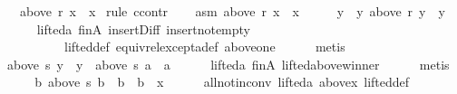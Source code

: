 \begin{isabellebody}
\ \ \ {\isachardoublequoteopen}above\ r\ x\ {\isacharequal}{\kern0pt}\ {\isacharbraceleft}{\kern0pt}x{\isacharbraceright}{\kern0pt}{\isachardoublequoteclose}\isanewline
%
\isadelimproof
%
\endisadelimproof
%
\isatagproof
{}\isamarkupfalse%
\ {\isacharparenleft}{\kern0pt}rule\ ccontr{\isacharparenright}{\kern0pt}\isanewline
\ \ \isamarkupfalse%
\ asm{\isacharcolon}{\kern0pt}\ {\isachardoublequoteopen}above\ r\ x\ {\isasymnoteq}\ {\isacharbraceleft}{\kern0pt}x{\isacharbraceright}{\kern0pt}{\isachardoublequoteclose}\isanewline
\ \ \isamarkupfalse%
\ \isamarkupfalse%
\ y\ \ y{\isacharcolon}{\kern0pt}\ {\isachardoublequoteopen}above\ r\ y\ {\isacharequal}{\kern0pt}\ {\isacharbraceleft}{\kern0pt}y{\isacharbraceright}{\kern0pt}{\isachardoublequoteclose}\isanewline
\ \ \ \ \isamarkupfalse%
\ lifted{\isacharunderscore}{\kern0pt}a\ fin{\isacharunderscore}{\kern0pt}A\ insert{\isacharunderscore}{\kern0pt}Diff\ insert{\isacharunderscore}{\kern0pt}not{\isacharunderscore}{\kern0pt}empty\isanewline
\ \ \ \ \ \ \ \ \ \ lifted{\isacharunderscore}{\kern0pt}def\ equiv{\isacharunderscore}{\kern0pt}rel{\isacharunderscore}{\kern0pt}except{\isacharunderscore}{\kern0pt}a{\isacharunderscore}{\kern0pt}def\ above{\isacharunderscore}{\kern0pt}one\isanewline
\ \ \ \ \isamarkupfalse%
\ metis\isanewline
\ \ \isamarkupfalse%
\ {\isachardoublequoteopen}above\ s\ y\ {\isacharequal}{\kern0pt}\ {\isacharbraceleft}{\kern0pt}y{\isacharbraceright}{\kern0pt}\ {\isasymor}\ above\ s\ a\ {\isacharequal}{\kern0pt}\ {\isacharbraceleft}{\kern0pt}a{\isacharbraceright}{\kern0pt}{\isachardoublequoteclose}\isanewline
\ \ \ \ \isamarkupfalse%
\ lifted{\isacharunderscore}{\kern0pt}a\ fin{\isacharunderscore}{\kern0pt}A\ lifted{\isacharunderscore}{\kern0pt}above{\isacharunderscore}{\kern0pt}winner\isanewline
\ \ \ \ \isamarkupfalse%
\ metis\isanewline
\ \ \isamarkupfalse%
\ \isamarkupfalse%
\ {\isachardoublequoteopen}{\isasymforall}b{\isachardot}{\kern0pt}\ above\ s\ b\ {\isacharequal}{\kern0pt}\ {\isacharbraceleft}{\kern0pt}b{\isacharbraceright}{\kern0pt}\ {\isasymlongrightarrow}\ b\ {\isacharequal}{\kern0pt}\ x{\isachardoublequoteclose}\isanewline
\ \ \ \ \isamarkupfalse%
\ all{\isacharunderscore}{\kern0pt}not{\isacharunderscore}{\kern0pt}in{\isacharunderscore}{\kern0pt}conv\ lifted{\isacharunderscore}{\kern0pt}a\ above{\isacharunderscore}{\kern0pt}x\ lifted{\isacharunderscore}{\kern0pt}def\isanewline

\end{isabellebody}

